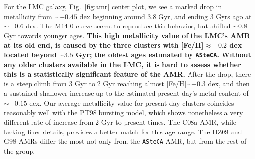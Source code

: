 \documentclass[referee]{aa}
\begin{document}
For the LMC galaxy, Fig.~\ref{fig:amr} center plot, we see a marked
drop in metallicity from ${\sim-}0.45$ dex beginning around 3.8 Gyr, and
ending 3 Gyrs ago at ${\sim-}0.6$ dex. The M14-0 curve seems to reproduce this
behavior, but shifted ${\sim}0.8$ Gyr towards younger ages.
%
\textbf{This high metallicity value of the LMC's AMR at its old end, is
caused by the three clusters with [Fe/H]${\approx-0.2}$ dex located beyond
${\sim}3.5$ Gyr; the oldest ages estimated by \texttt{ASteCA}. Without any older
clusters available in the LMC, it is hard to assess whether this is a
statistically significant feature of the AMR.}
%
%
After the drop, there is a steep climb from 3 Gyr to 2 Gyr reaching almost 
[Fe/H]${\sim-}0.3$ dex, and then a sustained shallower increase up
to the estimated present day's metal content of ${\sim-}0.15$ dex.
%
Our average metallicity value for present day clusters coincides reasonably
well with the PT98 bursting model, which shows nonetheless a very different
rate of increase from 2 Gyr to present times. The C08a AMR, while lacking finer
details, provides a better match for this age range.
The HZ09 and G98 AMRs differ the most not only from the \texttt{ASteCA}
AMR, but from the rest of the group.
\end{document}

